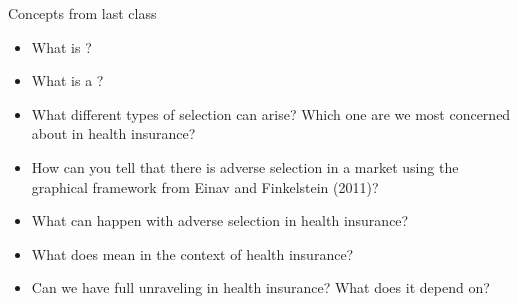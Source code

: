 \begin{frame}{Concepts from last class}

    \begin{itemize}
        \setlength{\itemsep}{2mm}
        \item What is ?
        \pause
        \item What is a ?
        \pause
        \item What different types of selection can arise? Which one are we most concerned about in health insurance?
        \pause
        \item How can you tell that there is adverse selection in a market using the graphical framework from Einav and Finkelstein (2011)?
        \pause
        \item What can happen with adverse selection in health insurance?
        \pause
        \item What does  mean in the context of health insurance?
        \pause
        \item Can we have full unraveling in health insurance? What does it depend on?
        \pause
    \end{itemize}
\end{frame}
